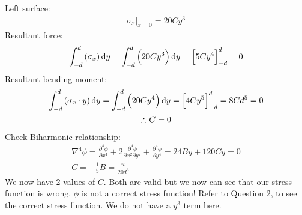 Left surface:
\begin{gather}
    \left. \sigma_{x} \right|_{x=0} = 20Cy^3
\end{gather}
Resultant force:
\begin{gather}
    \int_{-d}^d \left(\sigma_x\right)\dif y = \int^d_{-d} \left(20Cy^3\right)\dif y = \left[5Cy^4\right]^d_{-d}= 0
\end{gather}
Resultant bending moment:
\begin{gather}
    \int_{-d}^d \left(\sigma_x \cdot y \right)\dif y =\int_{-d}^d \left(20Cy^4\right)\dif y = \left[4Cy^5\right]_{-d}^d = 8Cd^5 = 0\\
    \therefore C = 0
\end{gather}
Check Biharmonic relationship:
\begin{gather}
    \nabla^4 \phi = \frac{\partial^4 \phi}{\partial x^4} + 2\frac{\partial^4\phi}{\partial x^2 \partial y^2} + \frac{\partial^4 \phi}{\partial y^4} = 24By + 120Cy = 0\\
    C = -\frac{1}{5} B = \frac{w}{20d^3}
\end{gather}
We now have 2 values of $C$. Both are valid but we now can see that our stress function is wrong. $\phi$ is not a correct stress function! Refer to Question 2, to see the correct stress function. We do not have a $y^3$ term here.
